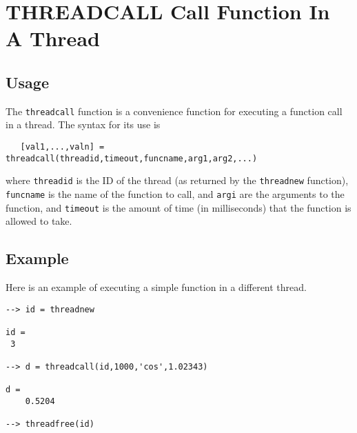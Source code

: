 \section{THREADCALL Call Function In A Thread}

\subsection{Usage}

The \verb|threadcall| function is a convenience function for executing
a function call in a thread.  The syntax for its use is
\begin{verbatim}
   [val1,...,valn] = threadcall(threadid,timeout,funcname,arg1,arg2,...)
\end{verbatim}
where \verb|threadid| is the ID of the thread (as returned by the
\verb|threadnew| function), \verb|funcname| is the name of the function to call,
and \verb|argi| are the arguments to the function, and \verb|timeout| is the
amount of time (in milliseconds) that the function is allowed to take.
\subsection{Example}

Here is an example of executing a simple function in a different thread.
\begin{verbatim}
--> id = threadnew

id = 
 3 

--> d = threadcall(id,1000,'cos',1.02343)

d = 
    0.5204 

--> threadfree(id)
\end{verbatim}

